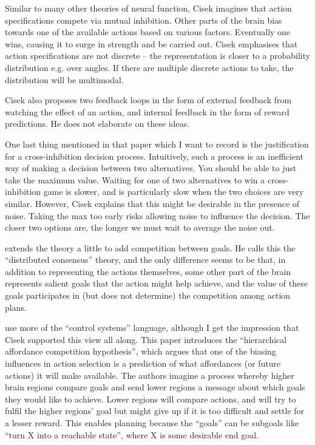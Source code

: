 \documentclass[10pt,a4paper]{article}
\newcommand{\nquote}[1]{``{#1}''}
\begin{document}
Similar to many other theories of neural function, Cisek imagines that action specifications compete via mutual inhibition. Other parts of the brain bias towards one of the available actions based on various factors. Eventually one wins, causing it to surge in strength and be carried out. Cisek emphasises that action specifications are not discrete -- the representation is closer to a probability distribution e.g. over angles. If there are multiple discrete actions to take, the distribution will be multimodal.

Cisek also proposes two feedback loops in the form of external feedback from watching the effect of an action, and internal feedback in the form of reward predictions. He does not elaborate on these ideas.

One last thing mentioned in that paper which I want to record is the justification for a cross-inhibition decision process. Intuitively, such a process is an inefficient way of making a decision between two alternatives. You should be able to just take the maximum value. Waiting for one of two alternatives to win a cross-inhibition game is slower, and is particularly slow when the two choices are very similar. However, Cisek explains that this might be desirable in the presence of noise. Taking the max too early risks allowing noise to influence the decision. The closer two options are, the longer we must wait to average the noise out.

\cite{cisek2012} extends the theory a little to add competition between goals. He calls this the \nquote{distributed consensus} theory, and the only difference seems to be that, in addition to representing the actions themselves, some other part of the brain represents salient goals that the action might help achieve, and the value of these goals participates in (but does not determine) the competition among action plans.

\cite{cisek2016} use more of the \nquote{control systems} language, although I get the impression that Cisek supported this view all along. This paper introduces the \nquote{hierarchical affordance competition hypothesis}, which argues that one of the biasing influences in action selection is a prediction of what affordances (or future actions) it will make available. The authors imagine a process whereby higher brain regions compare goals and send lower regions a message about which goals they would like to achieve. Lower regions will compare actions, and will try to fulfil the higher regions' goal but might give up if it is too difficult and settle for a lesser reward. This enables planning because the \nquote{goals} can be subgoals like \nquote{turn X into a reachable state}, where X is some desirable end goal.
\end{document}
